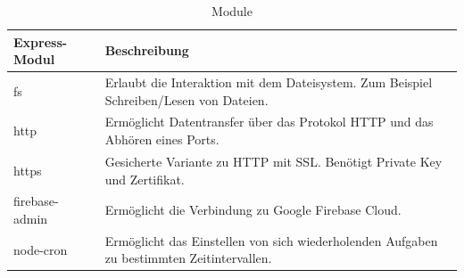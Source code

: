 \begin{table}[tbt]
\caption{Module}
\begin{center}
    \begin{tabular}{| l | p{8cm} |}
    \hline
    Express-Modul & Beschreibung \\ \hline
    fs & Erlaubt die Interaktion mit dem Dateisystem.\newline
	Zum Beispiel Schreiben/Lesen von Dateien.\\
    
    \hline
    http & Ermöglicht Datentransfer über das Protokol HTTP und das Abhören eines Ports.  \\
    
    \hline
	https & Gesicherte Variante zu HTTP mit SSL.\newline
	Benötigt Private Key und Zertifikat.  \\
	
    \hline    
    firebase-admin & Ermöglicht die Verbindung zu Google Firebase 			Cloud. \\ 
    
    \hline    
    node-cron & Ermöglicht das Einstellen von sich wiederholenden 			Aufgaben zu bestimmten Zeitintervallen.  \\
    \hline
    \end{tabular}
\end{center}
\end{table}

